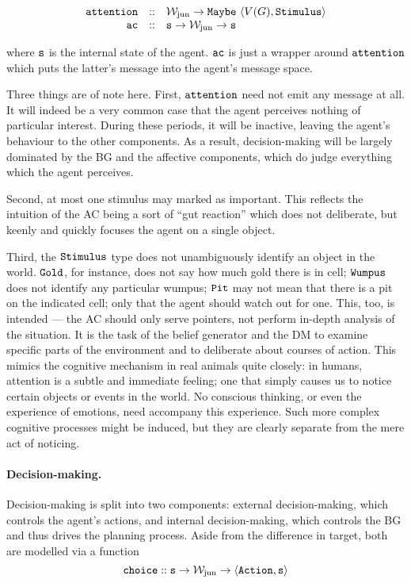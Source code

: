 $$
	\begin{array}{r c l}
		\field{attention} & :: & \type{\wjun \rightarrow Maybe\ \tuple{\mathnormal{V(G)}, Stimulus}}\\
		\field{ac} & :: & \type{s \rightarrow \wjun \rightarrow s}\\
	\end{array}
$$

where $\mathtt{s}$ is the internal state of the agent. $\mathtt{ac}$ is just a wrapper around $\mathtt{attention}$ which puts the latter's message into the agent's message space.

Three things are of note here. First, $\mathtt{attention}$ need not emit any message at all. It will indeed be a very common case that the agent perceives nothing of particular interest. During these periods, it will be inactive, leaving the agent's behaviour to the other components. As a result, decision-making will be largely dominated by the BG and the affective components, which do judge everything which the agent perceives.

Second, at most one stimulus may marked as important. This reflects the intuition of the AC being a sort of ``gut reaction'' which does not deliberate, but keenly and quickly focuses the agent on a single object. 

Third, the $\mathtt{Stimulus}$ type does not unambiguously identify an object in the world. $\mathtt{Gold}$, for instance, does not say how much gold there is in cell; $\mathtt{Wumpus}$ does not identify any particular wumpus; $\mathtt{Pit}$ may not mean that there is a pit on the indicated cell; only that the agent should watch out for one. This, too, is intended --- the AC should only serve pointers, not perform in-depth analysis of the situation. It is the task of the belief generator and the DM to examine specific parts of the environment and to deliberate about courses of action. This mimics the cognitive mechanism in real animals quite closely: in humans, attention is a subtle and immediate feeling; one that simply causes us to notice certain objects or events in the world. No conscious thinking, or even the experience of emotions, need accompany this experience. Such more complex cognitive processes might be induced, but they are clearly separate from the mere act of noticing.

\paragraph{Decision-making.} Decision-making is split into two components: external decision-making, which controls the agent's actions, and internal decision-making, which controls the BG and thus drives the planning process. Aside from the difference in target, both are modelled via a function
$$
	\mathtt{choice} :: \mathtt{s \rightarrow \mathcal{W}_{\mathrm{jun}} \rightarrow \langle Action, s \rangle}
$$


